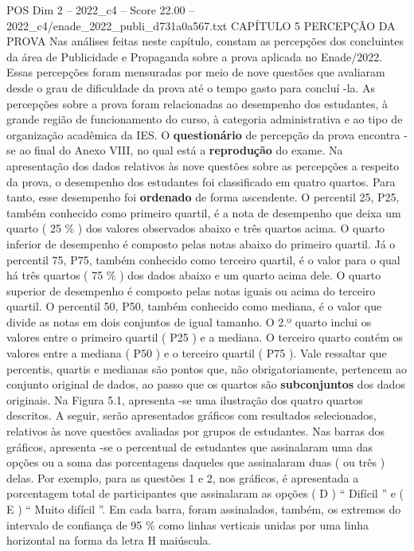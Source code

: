 \begin{textsample}{POS Dim 2 – 2022\_c4 – Score 22.00 – 2022\_c4/enade\_2022\_publi\_d731a0a567.txt}  \label{ex:f2_pos_023}
CAPÍTULO 5 PERCEPÇÃO DA PROVA Nas análises feitas neste capítulo, constam as percepções dos concluintes da área de Publicidade e Propaganda sobre a prova aplicada no Enade/2022.
Essas percepções foram mensuradas por meio de nove questões que avaliaram desde o grau de dificuldade da prova até o tempo gasto para concluí -la.
As percepções sobre a prova foram relacionadas ao desempenho dos estudantes, à grande região de funcionamento do curso, à categoria administrativa e ao tipo de organização acadêmica da IES.
O \textbf{questionário} de percepção da prova encontra -se ao final do Anexo VIII, no qual está a \textbf{reprodução} do exame.
Na apresentação dos dados relativos às nove questões sobre as percepções a respeito da prova, o desempenho dos estudantes foi classificado em quatro quartos.
Para tanto, esse desempenho foi \textbf{ordenado} de forma ascendente.
O percentil 25, P25, também conhecido como primeiro quartil, é a nota de desempenho que deixa um quarto ( 25 \% ) dos valores observados abaixo e três quartos acima.
O quarto inferior de desempenho é composto pelas notas abaixo do primeiro quartil.
Já o percentil 75, P75, também conhecido como terceiro quartil, é o valor para o qual há três quartos ( 75 \% ) dos dados abaixo e um quarto acima dele.
O quarto superior de desempenho é composto pelas notas iguais ou acima do terceiro quartil.
O percentil 50, P50, também conhecido como mediana, é o valor que divide as notas em dois conjuntos de igual tamanho.
O 2.º quarto inclui os valores entre o primeiro quartil ( P25 ) e a mediana.
O terceiro quarto contém os valores entre a mediana ( P50 ) e o terceiro quartil ( P75 ).
Vale ressaltar que percentis, quartis e medianas são pontos que, não obrigatoriamente, pertencem ao conjunto original de dados, ao passo que os quartos são \textbf{subconjuntos} dos dados originais.
Na Figura 5.1, apresenta -se uma ilustração dos quatro quartos descritos.
A seguir, serão apresentados gráficos com resultados selecionados, relativos às nove questões avaliadas por grupos de estudantes.
Nas barras dos gráficos, apresenta -se o percentual de estudantes que assinalaram uma das opções ou a soma das porcentagens daqueles que assinalaram duas ( ou três ) delas.
Por exemplo, para as questões 1 e 2, nos gráficos, é apresentada a porcentagem total de participantes que assinalaram as opções ( D ) “ Difícil ” e ( E ) “ Muito difícil ”.
Em cada barra, foram assinalados, também, os extremos do intervalo de confiança de 95 \% como linhas verticais unidas por uma linha horizontal na forma da letra H maiúscula.

\end{textsample}
